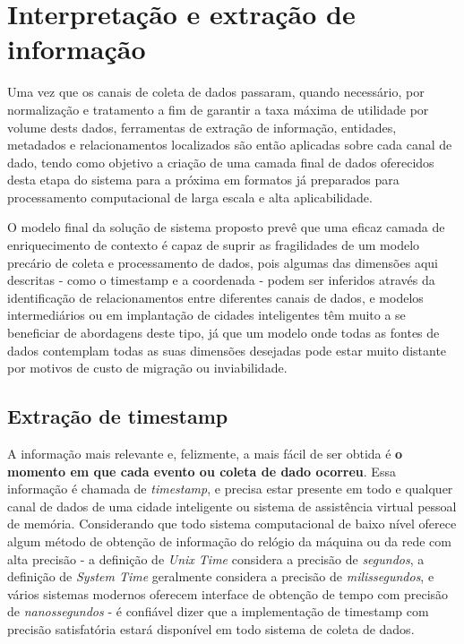 \section{Interpretação e extração de informação} \label{s:interpretacao_e_extracao_de_informacao}

Uma vez que os canais de coleta de dados passaram, quando necessário, por normalização e tratamento a fim de garantir a taxa máxima de utilidade por volume dests dados, ferramentas de extração de informação, entidades, metadados e relacionamentos localizados são então aplicadas sobre cada canal de dado, tendo como objetivo a criação de uma camada final de dados oferecidos desta etapa do sistema para a próxima em formatos já preparados para processamento computacional de larga escala e alta aplicabilidade.

 O modelo final da solução de sistema proposto prevê que uma eficaz camada de enriquecimento de contexto é capaz de suprir as fragilidades de um modelo precário de coleta e processamento de dados, pois algumas das dimensões aqui descritas - como o timestamp e a coordenada - podem ser inferidos através da identificação de relacionamentos entre diferentes canais de dados, e modelos intermediários ou em implantação de cidades inteligentes têm muito a se beneficiar de abordagens deste tipo, já que um modelo onde todas as fontes de dados contemplam todas as suas dimensões desejadas pode estar muito distante por motivos de custo de migração ou inviabilidade.

\subsection{Extração de timestamp} \label{ss:extracao_de_timestamp}

A informação mais relevante e, felizmente, a mais fácil de ser obtida é \textbf{o momento em que cada evento ou coleta de dado ocorreu}. Essa informação é chamada de \textit{timestamp}, e precisa estar presente em todo e qualquer canal de dados de uma cidade inteligente ou sistema de assistência virtual pessoal de memória. Considerando que todo sistema computacional de baixo nível oferece algum método de obtenção de informação do relógio da máquina ou da rede com alta precisão - a definição de \textit{Unix Time} considera a precisão de \textit{segundos}, a definição de \textit{System Time} geralmente considera a precisão de \textit{milissegundos}, e vários sistemas modernos oferecem interface de obtenção de tempo com precisão de \textit{nanossegundos} - é confiável dizer que a implementação de timestamp com precisão satisfatória estará disponível em todo sistema de coleta de dados.

